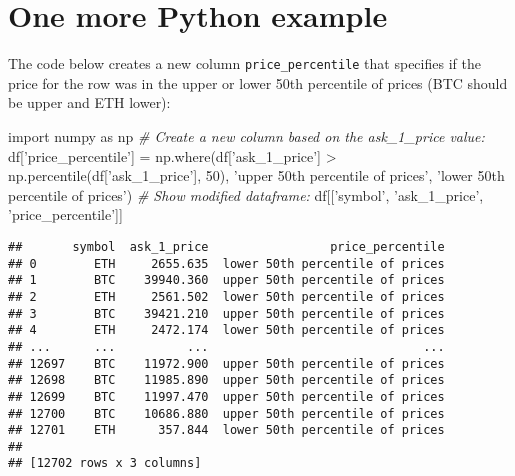 \documentclass[]{tufte-handout}
\newenvironment{Shaded}{}{}
\newcommand{\CommentTok}[1]{\textcolor[rgb]{0.38,0.63,0.69}{\textit{#1}}}
\newcommand{\DecValTok}[1]{\textcolor[rgb]{0.25,0.63,0.44}{#1}}
\newcommand{\ImportTok}[1]{#1}
\newcommand{\NormalTok}[1]{#1}
\newcommand{\OperatorTok}[1]{\textcolor[rgb]{0.40,0.40,0.40}{#1}}
\newcommand{\StringTok}[1]{\textcolor[rgb]{0.25,0.44,0.63}{#1}}
\begin{document}
\hypertarget{one-more-python-example}{%
\section{One more Python example}\label{one-more-python-example}}

The code below creates a new column \texttt{price\_percentile} that
specifies if the price for the row was in the upper or lower 50th
percentile of prices (BTC should be upper and ETH lower):

\begin{Shaded}
\begin{Highlighting}[]
\ImportTok{import}\NormalTok{ numpy }\ImportTok{as}\NormalTok{ np}
\CommentTok{# Create a new column based on the ask_1_price value:}
\NormalTok{df[}\StringTok{'price_percentile'}\NormalTok{] }\OperatorTok{=}\NormalTok{ np.where(df[}\StringTok{'ask_1_price'}\NormalTok{] }\OperatorTok{>} 
\NormalTok{                                  np.percentile(df[}\StringTok{'ask_1_price'}\NormalTok{], }\DecValTok{50}\NormalTok{),}
                            \StringTok{'upper 50th percentile of prices'}\NormalTok{, }
                            \StringTok{'lower 50th percentile of prices'}\NormalTok{)}
\CommentTok{# Show modified dataframe:}
\NormalTok{df[[}\StringTok{'symbol'}\NormalTok{, }\StringTok{'ask_1_price'}\NormalTok{, }\StringTok{'price_percentile'}\NormalTok{]]}
\end{Highlighting}
\end{Shaded}

\begin{verbatim}
##       symbol  ask_1_price                 price_percentile
## 0        ETH     2655.635  lower 50th percentile of prices
## 1        BTC    39940.360  upper 50th percentile of prices
## 2        ETH     2561.502  lower 50th percentile of prices
## 3        BTC    39421.210  upper 50th percentile of prices
## 4        ETH     2472.174  lower 50th percentile of prices
## ...      ...          ...                              ...
## 12697    BTC    11972.900  upper 50th percentile of prices
## 12698    BTC    11985.890  upper 50th percentile of prices
## 12699    BTC    11997.470  upper 50th percentile of prices
## 12700    BTC    10686.880  upper 50th percentile of prices
## 12701    ETH      357.844  lower 50th percentile of prices
## 
## [12702 rows x 3 columns]
\end{verbatim}
\end{document}
